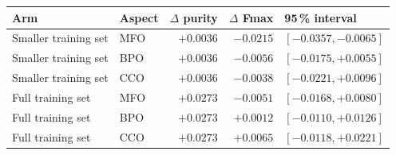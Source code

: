\begin{tabular}{llrrl}
\toprule
    \textbf{Arm} & \textbf{Aspect} & \textbf{$\Delta$ purity} & \textbf{$\Delta$ Fmax} & \textbf{95\,\% interval} \\
\midrule
    Smaller training set & MFO & $+0.0036$ & $-0.0215$ & $[-0.0357, -0.0065]$ \\
    Smaller training set & BPO & $+0.0036$ & $-0.0056$ & $[-0.0175, +0.0055]$ \\
    Smaller training set & CCO & $+0.0036$ & $-0.0038$ & $[-0.0221, +0.0096]$ \\
    Full training set & MFO & $+0.0273$ & $-0.0051$ & $[-0.0168, +0.0080]$ \\
    Full training set & BPO & $+0.0273$ & $+0.0012$ & $[-0.0110, +0.0126]$ \\
    Full training set & CCO & $+0.0273$ & $+0.0065$ & $[-0.0118, +0.0221]$ \\
\bottomrule
\end{tabular}
